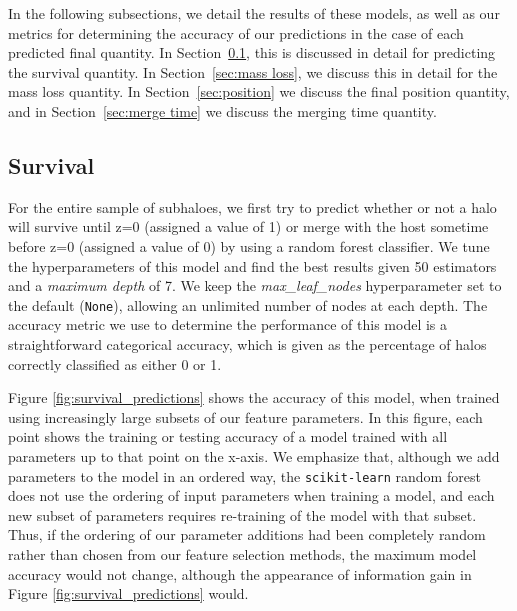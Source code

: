 \documentclass[fleqn,usenatbib]{mnras}
\begin{document}
In the following subsections, we detail the results of these models, as well as our metrics for determining the accuracy of our predictions in the case of each predicted final quantity. In Section~\ref{sec:survival}, this is discussed in detail for predicting the survival quantity. In Section~\ref{sec:mass loss}, we discuss this in detail for the mass loss quantity. In Section~\ref{sec:position} we discuss the final position quantity, and in Section~\ref{sec:merge time} we discuss the merging time quantity.

\subsection{Survival}
\label{sec:survival} %

For the entire sample of subhaloes, we first try to predict whether or not a halo will survive until z=0 (assigned a value of 1) or merge with the host sometime before z=0 (assigned a value of 0) by using a random forest classifier. We tune the hyperparameters of this model and find the best results given 50 estimators and a \textit{maximum depth} of 7. We keep the \textit{max\_leaf\_nodes} hyperparameter set to the default (\texttt{None}), allowing an unlimited number of nodes at each depth. The accuracy metric we use to determine the performance of this model is a straightforward categorical accuracy, which is given as the percentage of halos correctly classified as either 0 or 1.

Figure \ref{fig:survival_predictions} shows the accuracy of this model, when trained using increasingly large subsets of our feature parameters. In this figure, each point shows the training or testing accuracy of a model trained with all parameters up to that point on the x-axis. We emphasize that, although we add parameters to the model in an ordered way, the \texttt{scikit-learn} random forest does not use the ordering of input parameters when training a model, and each new subset of parameters requires re-training of the model with that subset. Thus, if the ordering of our parameter additions had been completely random rather than chosen from our feature selection methods, the maximum model accuracy would not change, although the appearance of information gain in Figure \ref{fig:survival_predictions} would. 
\end{document}
